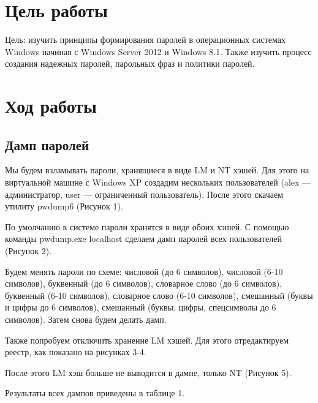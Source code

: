 \section{Цель работы}
Цель: изучить принципы формирования паролей в операционных системах Windows начиная с Windows Server 2012 и Windows 8.1. Также изучить процесс создания надежных паролей, парольных фраз и политики паролей.

\section{Ход работы}
\subsection{Дамп паролей}
Мы будем взламывать пароли, хранящиеся в виде LM и NT хэшей. Для этого на виртуальной машине с Windows XP создадим нескольких пользователей (alex — администратор, user — ограниченный пользователь). После этого скачаем утилиту pwdump6 (Рисунок 1).

\FloatBarrier

По умолчанию в системе пароли хранятся в виде обоих хэшей. С помощью команды pwdump.exe localhost сделаем дамп паролей всех пользователей (Рисунок 2).

\FloatBarrier

Будем менять пароли по схеме: числовой (до 6 символов), числовой (6-10 символов), буквенный (до 6 символов), словарное слово (до 6 символов), буквенный (6-10 символов), словарное слово (6-10 символов), смешанный (буквы и цифры до 6 символов), смешанный (буквы, цифры, спецсимволы до 6 символов). Затем снова будем делать дамп. 

Также попробуем отключить хранение LM хэшей. Для этого отредактируем реестр, как показано на рисунках 3-4.

\FloatBarrier

После этого LM хэш больше не выводится в дампе, только NT (Рисунок 5).

\FloatBarrier

Результаты всех дампов приведены в таблице 1.

